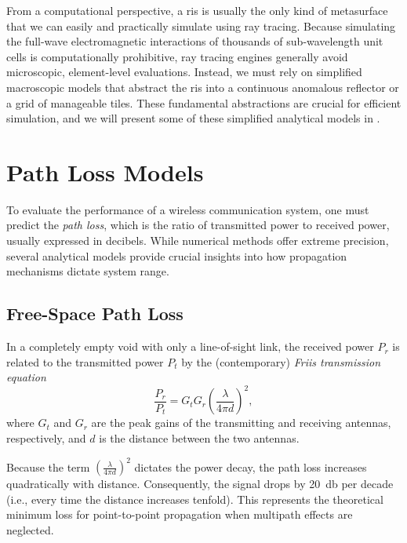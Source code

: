 From a computational perspective, a \gls{ris} is usually the only kind of metasurface that we can easily and practically simulate using ray tracing. Because simulating the full-wave electromagnetic interactions of thousands of sub-\gls{wavelength} unit cells is computationally prohibitive, ray tracing engines generally avoid microscopic, element-level evaluations. Instead, we must rely on simplified macroscopic models that abstract the \gls{ris} into a continuous anomalous reflector or a grid of manageable tiles. These fundamental abstractions are crucial for efficient simulation, and we will present some of these simplified analytical models in .

\begin{marginfigure}[-12\baselineskip]
  \centering
  \caption{Example scenario where a  is used to redirect the signal towards the receiver, adapted from~\cite[Fig.~3]{Bjornson2022}.}
\end{marginfigure}

\section{Path Loss Models}

To evaluate the performance of a wireless communication system, one must predict the \emph{path loss}, which is the ratio of transmitted power to received power, usually expressed in decibels. While numerical methods offer extreme precision, several analytical models provide crucial insights into how propagation mechanisms dictate system range.

\subsection{Free-Space Path Loss}

In a completely empty void with only a \gls{line-of-sight} link, the received power $P_r$ is related to the transmitted power $P_t$ by the (contemporary) \emph{Friis transmission equation}~
\begin{equation}
  \frac{P_r}{P_t} = G_t G_r \left(\frac{\lambda}{4\pi d}\right)^2,
\end{equation}
where $G_t$ and $G_r$ are the peak gains of the transmitting and receiving antennas, respectively, and $d$ is the distance between the two antennas.

Because the term $\left(\tfrac{\lambda}{4\pi d}\right)^2$ dictates the power decay, the  path loss increases quadratically with distance. Consequently, the signal drops by \qty{20}{\decibel} per decade (i.e., every time the distance increases tenfold). This represents the theoretical minimum loss for point-to-point propagation when multipath effects are neglected.

